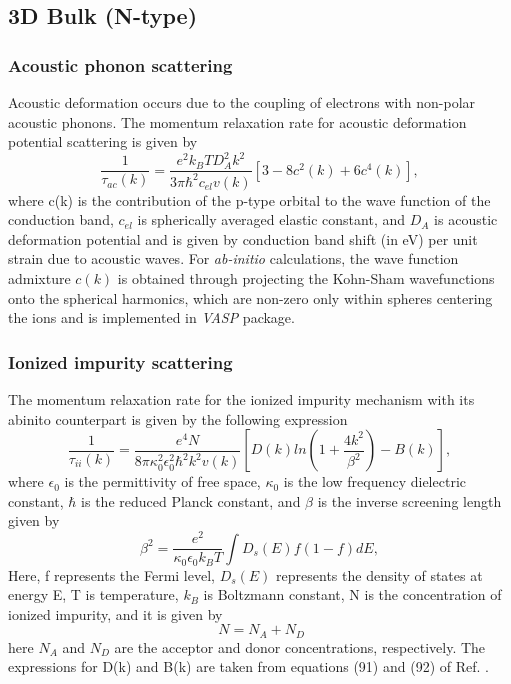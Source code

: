 \documentclass[12pt]{article}
\begin{document}
\subsection{3D Bulk (N-type)}

\subsubsection{Acoustic phonon scattering}

Acoustic deformation occurs due to the coupling of electrons with non-polar acoustic phonons. The momentum relaxation rate for acoustic deformation potential scattering is given by \cite{rode1}
\begin{equation}
\frac{1}{\tau_{ac}(k)} = \frac{e^2 k_B T D_A^2 k^2}{3\pi\hbar^2 c_{el}v(k)}[3 - 8c^2(k)+6c^4(k)] ,
\label{acoustic deformation}
\end{equation}
where c(k) is the contribution of the p-type orbital to the wave function of the conduction band, $c_{el}$ is spherically averaged elastic constant, and $D_A$ is acoustic deformation potential and is given by conduction band shift (in eV) per unit strain due to acoustic waves.  For \textit{ab-initio} calculations, the wave function admixture $c(k)$ is obtained through projecting the Kohn-Sham wavefunctions onto the spherical harmonics, which are non-zero only within spheres centering the ions and is implemented in \textsl{VASP} package. \\

\subsubsection{Ionized impurity scattering}
The momentum relaxation rate for the ionized impurity mechanism with its abinito counterpart is given by the following expression \cite{anup1}
\begin{equation}
\frac{1}{\tau_{ii}(k)} = \frac{e^4 N }{8\pi \kappa_0^2 \epsilon_0^2\hbar^2 k^2 v(k)}[D(k)ln(1+\frac{4k^2}{\beta^2})-B(k)] ,
\label{Ionized impurity}
\end{equation}
where $\epsilon_0$ is the permittivity of free space, $\kappa_0$ is the low frequency dielectric constant, $\hbar$ is the reduced Planck constant, and $\beta$ is the inverse screening length given by
\begin{equation}
\beta^2 = \frac{e^2}{\kappa_0 \epsilon_0 k_B T}\int D_s(E) f(1-f)dE,
\label{beta square}
\end{equation}
Here, f represents the Fermi level, $D_s(E)$ represents the density of states at energy E, T is temperature, $k_B$ is Boltzmann constant, N is the concentration of ionized impurity, and it is given by
\begin{equation}
\ N = N_A + N_D
\label{impurity}
\end{equation} 
here $N_A$ and $N_D$ are the acceptor and donor concentrations, respectively. The expressions for D(k) and B(k) are taken from equations (91) and (92) of Ref. \cite{rode1}. \\
\end{document}
